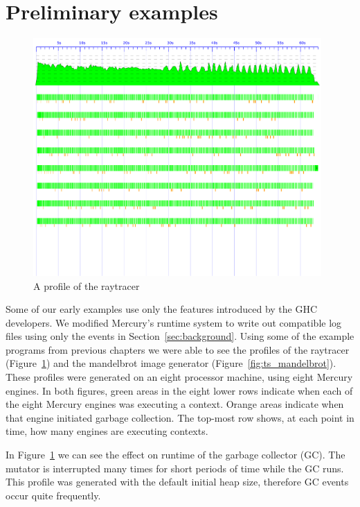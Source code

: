 \section{Preliminary examples}
\label{sec:tscope_example}

\begin{figure}
\includegraphics[width=0.98\textwidth]{pics/icfp2000_eventlog}
\caption{A profile of the raytracer}
\label{fig:ts_icfp2000}
\end{figure}

Some of our early examples use only the \tscope features introduced by the
GHC developers.
We modified Mercury's runtime system to write out compatible log files using
only the events in Section~\ref{sec:background}.
Using some of the example programs from previous chapters we were able to
see the \tscope profiles of the raytracer
(Figure~\ref{fig:ts_icfp2000})
and the mandelbrot image generator (Figure~\ref{fig:ts_mandelbrot}).
These profiles were generated on an eight processor machine, using eight
Mercury engines.
In both figures, green areas in the eight lower rows indicate when each of
the eight Mercury engines was executing a context.
Orange areas indicate when that engine initiated garbage collection.
The top-most row shows, at each point in time, how many engines are
executing contexts.

In Figure~\ref{fig:ts_icfp2000} we can see the effect on runtime of the
garbage collector (GC).
The mutator is interrupted many times for short periods of time while the
GC runs.
This profile was generated with the default initial heap size,
therefore GC events occur quite frequently.

